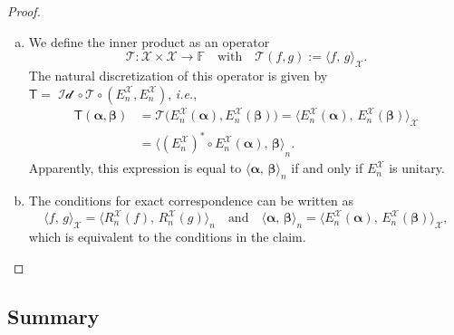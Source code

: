 \documentclass[a4paper]{paper}
\newcommand{\Spc}[1]{\mathscr{#1}}
\newcommand{\Field}{\mathbb{F}}
\newcommand{\Op}[1]{\mathcal{#1}}
\newcommand{\DiscOp}[1]{\mathsf{#1}}
\newcommand*{\EXT}[2]{\ensuremath{E_{#1}^{#2}}}
\newcommand*{\REST}[2]{\ensuremath{R_{#1}^{#2}}}
\newcommand*{\RnX}{\ensuremath{\REST{n}{\Spc{X}}}}
\newcommand*{\EnX}{\ensuremath{\EXT{n}{\Spc{X}}}}
\DeclareMathOperator{\Id}{Id}
\newcommand*{\INNER}[2]{\ensuremath{\langle #1,\,#2\rangle}}
\newcommand*{\INNERbig}[2]{\ensuremath{\big\langle #1,\,#2\big\rangle}}
\newcommand{\ie}{\textsl{i.e.}\xspace}
\newcommand{\valpha}{\boldsymbol{\alpha}}
\newcommand{\vbeta}{\boldsymbol{\beta}}
\begin{document}
\begin{proof}~
 \begin{enumerate}[(a)]
  \item We define the inner product as an operator
  \begin{equation*}
   \Op{T} \colon \Spc{X} \times \Spc{X} \to \Field
   \quad \text{with} \quad
   \Op{T}(f, g) := \INNER{f}{g}_{\Spc{X}}.
  \end{equation*}
  The natural discretization of this operator is given by $\DiscOp{T} = \Op{\Id} \circ \Op{T} \circ (\EnX, \EnX)$, \ie,
  \begin{align*}
   \DiscOp{T}(\valpha, \vbeta) 
   &= \Op{T}\big( \EnX(\valpha), \EnX(\vbeta) \big) 
   = \INNERbig{\EnX(\valpha)}{\EnX(\vbeta)}_{\Spc{X}} \\
   &= \INNERbig{(\EnX)^* \circ \EnX(\valpha)}{\vbeta}_n.
  \end{align*}
  Apparently, this expression is equal to $\INNER{\valpha}{\vbeta}_n$ if and only if $\EnX$ is unitary.

  \item The conditions for exact correspondence can be written as
  \begin{equation*}
   \INNER{f}{g}_{\Spc{X}} = \INNERbig{\RnX(f)}{\RnX(g)}_n
   \quad \text{and} \quad
   \INNER{\valpha}{\vbeta}_n = \INNERbig{\EnX(\valpha)}{\EnX(\vbeta)}_{\Spc{X}},
  \end{equation*}
  which is equivalent to the conditions in the claim.
 \end{enumerate}
\end{proof}



\subsection{Summary}
\label{subsec:prop:summary}
\end{document}
